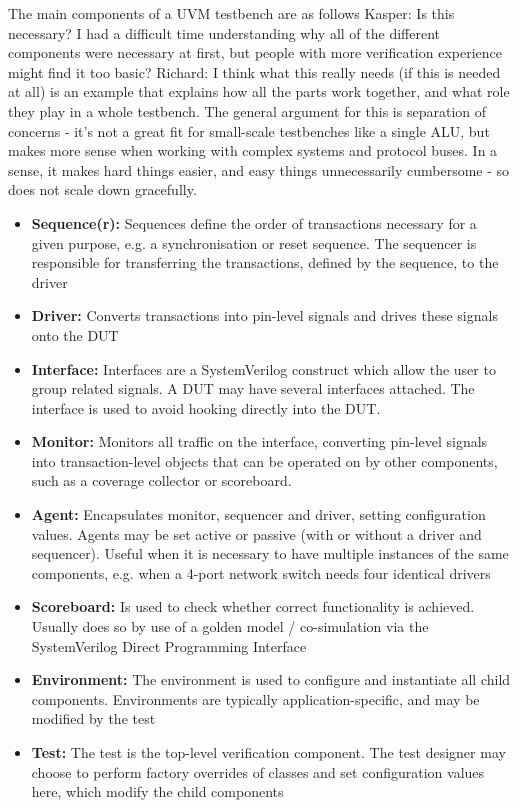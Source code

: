 \documentclass[a4paper, conference]{IEEEtran}
\newcommand{\ducky}[1]{{\color{orange} Richard: #1}}
\newcommand{\kasper}[1]{{\color{purple} Kasper: #1}}
\begin{document}
The main components of a UVM testbench are as follows
\kasper{Is this necessary? I had a difficult time understanding why all of the different components were necessary at first, but people with more verification experience might find it too basic?}
\ducky{I think what this really needs (if this is needed at all) is an example that explains how all the parts work together, and what role they play in a whole testbench. The general argument for this is separation of concerns - it's not a great fit for small-scale testbenches like a single ALU, but makes more sense when working with complex systems and protocol buses. In a sense, it makes hard things easier, and easy things unnecessarily cumbersome - so does not scale down gracefully.}
\begin{itemize}
    \item \textbf{Sequence(r):} Sequences define the order of transactions necessary for a given purpose, e.g. a synchronisation or reset sequence. The sequencer is responsible for transferring the transactions, defined by the sequence, to the driver
    \item \textbf{Driver:} Converts transactions into pin-level signals and drives these signals onto the DUT
    \item \textbf{Interface:} Interfaces are a SystemVerilog construct which allow the user to group related signals. A DUT may have several interfaces attached. The interface is used to avoid hooking directly into the DUT. 
    \item \textbf{Monitor:} Monitors all traffic on the interface, converting pin-level signals into transaction-level objects that can be operated on by other components, such as a coverage collector or scoreboard. 
    \item \textbf{Agent:} Encapsulates monitor, sequencer and driver, setting configuration values. Agents may be set active or passive (with or without a driver and sequencer). Useful when it is necessary to have multiple instances of the same components, e.g. when a 4-port network switch needs four identical drivers
    \item \textbf{Scoreboard:} Is used to check whether correct functionality is achieved. Usually does so by use of a golden model / co-simulation via the SystemVerilog Direct Programming Interface
    \item \textbf{Environment:} The environment is used to configure and instantiate all child components. Environments are typically application-specific, and may be modified by the test
    \item \textbf{Test:} The test is the top-level verification component. The test designer may choose to perform factory overrides of classes and set configuration values here, which modify the child components
\end{itemize}
\end{document}
